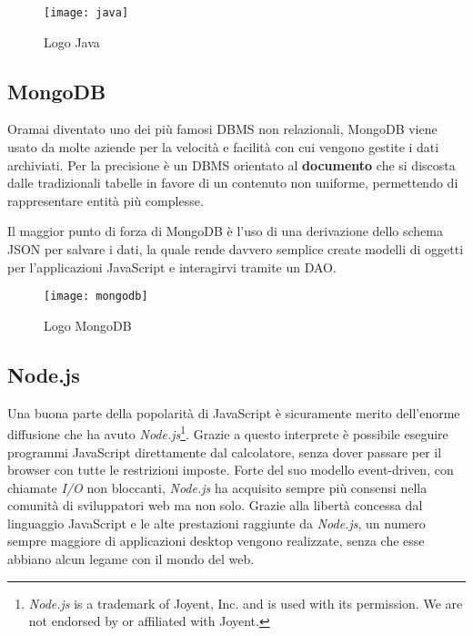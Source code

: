 \begin{figure}[H]
\begin{center}
\texttt{[image: java]}
\caption{Logo Java}
\label{fig:java_logo}
\end{center}
\end{figure}

\subsection{MongoDB}
Oramai diventato uno dei più famosi \gls{DBMS} non relazionali, MongoDB viene
usato da molte aziende per la velocità e facilità con cui vengono gestite i
dati archiviati. Per la precisione è un \gls{DBMS} orientato al
\textbf{documento} che si discosta dalle tradizionali tabelle in favore di un
contenuto non uniforme, permettendo di rappresentare entità più complesse.

Il maggior punto di forza di MongoDB è l'uso di una derivazione dello schema
\gls{JSON} per salvare i dati, la quale rende davvero semplice create modelli di
oggetti per l'applicazioni JavaScript e interagirvi tramite un \gls{DAO}.

\begin{figure}[H]
\begin{center}
\texttt{[image: mongodb]}
\caption{Logo MongoDB}
\label{fig:mongodb_logo}
\end{center}
\end{figure}

\subsection{Node.js}
Una buona parte della popolarità di JavaScript è sicuramente merito dell'enorme
diffusione che ha avuto \textit{Node.js}\footnote{\textit{Node.js} is a
trademark of Joyent, Inc. and is used with its permission. We are not endorsed
by or affiliated with Joyent.}. Grazie a questo interprete è possibile eseguire
programmi JavaScript direttamente dal calcolatore, senza dover passare per il
browser con tutte le restrizioni imposte. Forte del suo modello
\gls{event-driven}, con chiamate \textit{I/O} non bloccanti, \textit{Node.js}
ha acquisito sempre più consensi nella comunità di sviluppatori web ma non solo.
Grazie alla libertà concessa dal linguaggio JavaScript e le alte prestazioni
raggiunte da \textit{Node.js}, un numero sempre maggiore di applicazioni desktop
vengono realizzate, senza che esse abbiano alcun legame con il mondo del web.

